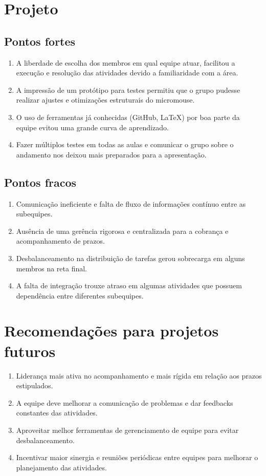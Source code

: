 \section{Projeto}
\subsection{Pontos fortes}
\begin{enumerate}
    \item A liberdade de escolha dos membros em qual equipe atuar, facilitou a execução e resolução das atividades devido a familiaridade com a área.
    \item A impressão de um protótipo para testes permitiu que o grupo pudesse realizar ajustes e otimizações estruturais do micromouse.
    \item O uso de ferramentas já conhecidas (GitHub, LaTeX) por boa parte da equipe evitou uma grande curva de aprendizado. 
    \item Fazer múltiplos testes em todas as aulas e comunicar o grupo sobre o andamento nos deixou mais preparados para a apresentação.
\end{enumerate}

\subsection{Pontos fracos}
\begin{enumerate}
    \item Comunicação ineficiente e falta de fluxo de informações contínuo entre as subequipes.
    \item Ausência de uma gerência rigorosa e centralizada para a cobrança e acompanhamento de prazos.
    \item Desbalanceamento na distribuição de tarefas gerou sobrecarga em alguns membros na reta final.
    \item A falta de integração trouxe atraso em algumas atividades que possuem dependência entre diferentes subequipes.
\end{enumerate}

\section{Recomendações para projetos futuros}

\begin{enumerate}
    \item Liderança mais ativa no acompanhamento e mais rígida em relação aos prazos estipulados.
    \item A equipe deve melhorar a comunicação de problemas e dar feedbacks constantes das atividades.
    \item Aproveitar melhor ferramentas de gerenciamento de equipe para evitar desbalanceamento.
    \item Incentivar maior sinergia e reuniões periódicas entre equipes para melhorar o planejamento das atividades.
\end{enumerate}

